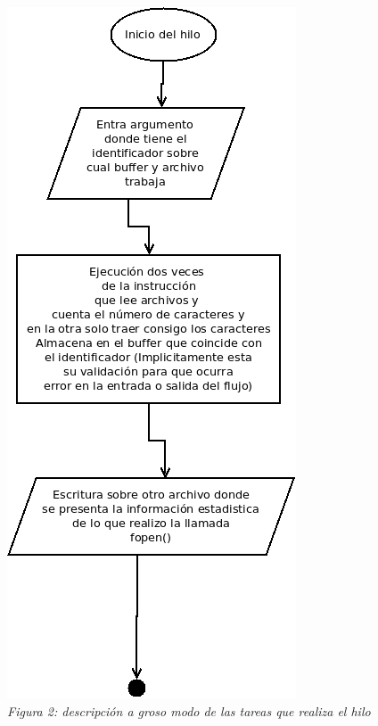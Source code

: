 \documentclass[11pt,a4paper]{article}
\begin{document}
\begin{center}
  \includegraphics[scale=0.5]{diagramaHilo.png}\\
  \textit{Figura 2: descripción a groso modo de las tareas que realiza el hilo}
\end{center}
\end{document}
